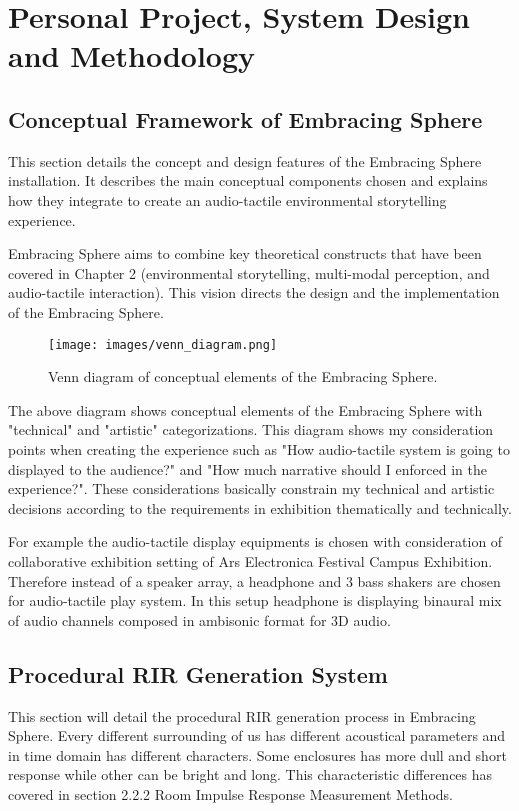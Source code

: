 \chapter{Personal Project, System Design and Methodology}
    \section{Conceptual Framework of Embracing Sphere}
        This section details the concept and design features of the Embracing Sphere installation. It describes the main conceptual components chosen and explains how they integrate to create an audio-tactile environmental storytelling experience.\par

        Embracing Sphere aims to combine key theoretical constructs that have been covered in Chapter 2 (environmental storytelling, multi-modal perception, and audio-tactile interaction). This vision directs the design and the implementation of the Embracing Sphere.\par

        \begin{figure}[H]
            \centering
            \texttt{[image: images/venn\_diagram.png]}
            \caption{Venn diagram of conceptual elements of the Embracing Sphere.}
            \label{fig:VENN}
        \end{figure}        

        The above diagram shows conceptual elements of the Embracing Sphere with "technical" and "artistic" categorizations. This diagram shows my consideration points when creating the experience such as "How audio-tactile system is going to displayed to the audience?" and "How much narrative should I enforced in the experience?". These considerations basically constrain my technical and artistic decisions according to the requirements in exhibition thematically and technically.\par

        For example the audio-tactile display equipments is chosen with consideration of collaborative exhibition setting of Ars Electronica Festival Campus Exhibition. Therefore instead of a speaker array, a headphone and 3 bass shakers are chosen for audio-tactile play system. In this setup headphone is displaying binaural mix of audio channels composed in ambisonic format for 3D audio.\par
    \section{Procedural RIR Generation System}
        This section will detail the procedural RIR generation process in Embracing Sphere. Every different surrounding of us has different acoustical parameters and in time domain has different characters. Some enclosures has more dull and short response while other can be bright and long. This characteristic differences has covered in section 2.2.2 Room Impulse Response Measurement Methods.\par

